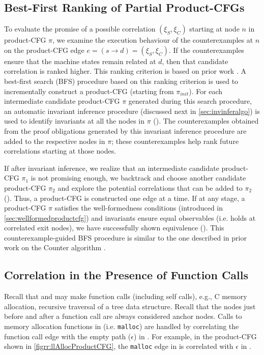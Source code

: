 \subsection{Best-First Ranking of Partial Product-CFGs}
\label{sec:rankproductcfg}
To evaluate the promise of a possible correlation $(\xi_S,\xi_C)$ starting at node $n$
in product-CFG $\pi$, we examine the execution behaviour of the counterexamples at $n$ on
the product-CFG edge $e=(s\rightarrow d)=(\xi_S,\xi_C)$.
If the counterexamples ensure that the machine states remain related at $d$,
then that candidate correlation is ranked higher.
This ranking criterion is based on prior work \cite{oopsla20}.
A best-first search (BFS) procedure based on this ranking criterion is used to incrementally construct
a product-CFG (starting from $\pi_{init}$).
For each intermediate candidate product-CFG $\pi$ generated during this search procedure,
an automatic invariant inference procedure (discussed next in \cref{sec:invinferalgo}) is
used to identify invariants at all the nodes in $\pi$ ().
The counterexamples obtained from the proof obligations generated by this invariant inference
procedure are added to the respective nodes in $\pi$; these counterexamples help rank
future correlations starting at those nodes.

If after invariant inference, we realize that an intermediate candidate product-CFG $\pi_1$
is not promising enough, we backtrack and choose another candidate product-CFG $\pi_2$
and explore the potential correlations that can be added to $\pi_2$ ().
Thus, a product-CFG is constructed one edge at a time.
If at any stage, a product-CFG $\pi$ satisfies the well-formedness conditions (introduced in \cref{sec:wellformedproductcfg})
and invariants ensure equal observables (i.e. \post{} holds at correlated exit nodes),
we have successfully shown equivalence ().
This counterexample-guided BFS procedure is similar to the one described in prior work on
the Counter algorithm \cite{oopsla20}.

\subsection{Correlation in the Presence of Function Calls}
\label{sec:correlfcalls}
Recall that \sprog{} and \cprog{} may make function calls (including self calls),
e.g., C memory allocation, recursive traversal of a tree data structure.
Recall that the nodes just before and after a function call are always considered anchor nodes.
Calls to memory allocation functions in \cprog{} (i.e. {\tt malloc}) are handled by correlating
the function call edge with the empty path ($\epsilon$) in \sprog{}.
For example, in the product-CFG shown in \cref{figrr:llAllocProductCFG}, the {\tt malloc} edge  in \cprog{}
is correlated with $\epsilon$ in \sprog{}.

